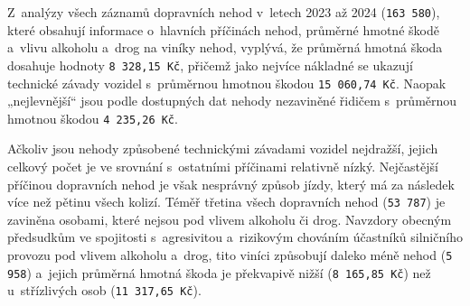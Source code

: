 \documentclass[a4paper, 10pt]{article}
\begin{document}
Z~analýzy všech záznamů dopravních nehod v~letech 2023 až 2024 (\texttt{163\,580}), které obsahují informace o~hlavních příčinách nehod, průměrné hmotné škodě a~vlivu alkoholu a~drog na viníky nehod, vyplývá, že průměrná hmotná škoda dosahuje hodnoty \texttt{8\,328,15\,Kč}, přičemž jako nejvíce nákladné se ukazují technické závady vozidel s~průměrnou hmotnou škodou \texttt{15\,060,74\,Kč}.
Naopak „nejlevnější“ jsou podle dostupných dat nehody nezaviněné řidičem s~průměrnou hmotnou škodou \texttt{4\,235,26\,Kč}.

Ačkoliv jsou nehody způsobené technickými závadami vozidel nejdražší, jejich celkový počet je ve srovnání s~ostatními příčinami relativně nízký.
Nejčastější příčinou dopravních nehod je však nesprávný způsob jízdy, který má za následek více než pětinu všech kolizí.
Téměř třetina všech dopravních nehod (\texttt{53\,787}) je zaviněna osobami, které nejsou pod vlivem alkoholu či drog.
Navzdory obecným předsudkům ve spojitosti s~agresivitou a~rizikovým chováním účastníků silničního provozu pod vlivem alkoholu a~drog, tito viníci způsobují daleko méně nehod (\texttt{5\,958}) a~jejich průměrná hmotná škoda je překvapivě nižší (\texttt{8\,165,85\,Kč}) než u~střízlivých osob (\texttt{11\,317,65\,Kč}).
\end{document}
